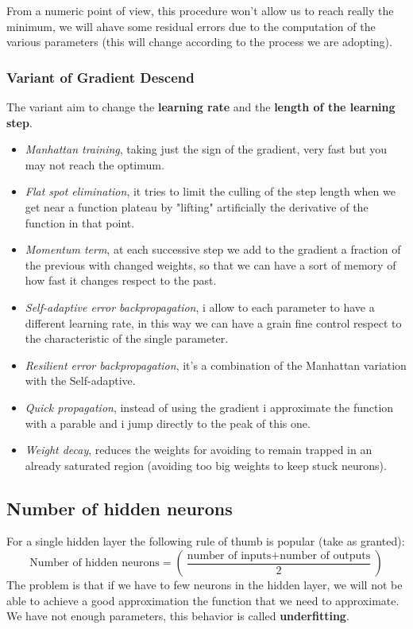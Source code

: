 \documentclass{article}
\begin{document}
From a numeric point of view, this procedure won't allow us to reach really the minimum, we will ahave some
residual errors due to the computation of the various parameters (this will change according to the
process we are adopting).

\subsubsection{Variant of Gradient Descend}
The variant aim to change the \textbf{learning rate} and the \textbf{length of the learning step}.

\begin{itemize}
    \item \textit{Manhattan training}, taking just the sign of the gradient, very fast but you may not reach
          the optimum.

    \item \textit{Flat spot elimination}, it tries to limit the culling of the step length when we get near a
          function plateau by "lifting" artificially the derivative of the function in that point.

    \item \textit{Momentum term}, at each successive step we add to the gradient a fraction of the previous
          with changed weights, so that we can have a sort of memory of how fast it changes respect to the past.

    \item \textit{Self-adaptive error backpropagation}, i allow to each parameter to have a different
          learning rate, in this way we can have a grain fine control respect to the characteristic of the single parameter.

    \item \textit{Resilient error backpropagation}, it's a combination of the Manhattan variation with the Self-adaptive.

    \item \textit{Quick propagation}, instead of using the gradient i approximate the function with a parable and i
          jump directly to the peak of this one.

    \item \textit{Weight decay}, reduces the weights for avoiding to remain trapped in an already saturated region
          (avoiding too big weights to keep stuck neurons).
\end{itemize}

\subsection{Number of hidden neurons}
For a single hidden layer the following rule of thumb is popular (take as granted):
$$\text{Number of hidden neurons} = \left(\frac{\text{number of inputs}+\text{number of outputs}}{2}\right)$$
The problem is that if we have to few neurons in the hidden layer, we will not be able to achieve a good approximation
the function that we need to approximate. We have not enough parameters, this behavior is called \textbf{underfitting}.
\end{document}
